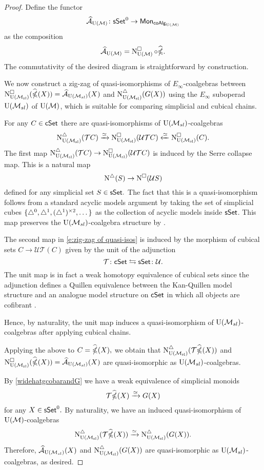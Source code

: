 \begin{proof}
	Define the functor
	$$\Ahat_{\UM} \colon \sSet^0 \to \Mon_{\coAlg_{\UM}}$$
	as the composition
	$$\Ahat_{\UM} = \cchainsUM \circ \widehat{\ccobar}.$$
	The commutativity of the desired diagram is straightforward by construction.
	
	We now construct a zig-zag of quasi-isomorphisms of $E_{\infty}$-coalgebras between $\cchainsUSL(\widehat{\ccobar}(X)) = \Ahat_{\USL}(X)$ and $\schainsUSL (G(X))$ using the $E_{\infty}$ suboperad $\USL$ of $\UM$, which is suitable for comparing simplicial and cubical chains.
	
	
	For any $C \in \cSet$ there are quasi-isomorphisms of $\USL$-coalgebras
	\begin{equation} \label{e:zig-zag of quasi-isos}
	\schainsUSL(\mathcal{T}C) \xra{\simeq}
	\cchainsUSL(\mathcal{U}\mathcal{T}C) \xleftarrow{\simeq}
	\cchainsUSL(C).
	\end{equation}	
	The first map $\schainsUSL(\mathcal{T}C) \to \cchainsUSL(\mathcal{U}\mathcal{T}C)$ is induced by the Serre collapse map.
	This is a natural map
	$$\schains(S) \to \cchains(\mathcal{U}S)$$
	defined for any simplicial set $S \in \sSet.$
	The fact that this is a quasi-isomorphism follows from a standard acyclic models argument by taking the set of simplicial cubes $\{ \simplex^0, \simplex^1, (\simplex^1)^{\times 2}, \dots\}$ as the collection of acyclic models inside $\sSet$. This map preserves the $\USL$-coalgebra structure by \cite{medina2021cubical}.
	
	The second map in \eqref{e:zig-zag of quasi-isos} is induced by the morphism of cubical sets $C \to \mathcal{U} \mathcal{T} (C)$ given by the unit of the adjunction
	$$\mathcal{T} \colon \cSet \leftrightarrows \sSet \colon \mathcal{U}.$$
	The unit map is in fact a weak homotopy equivalence of cubical sets since the adjunction defines a Quillen equivalence between the Kan-Quillen model structure and an analogue model structure on $\cSet$ in which all objects are cofibrant \cite{cisinski2006presheaves}.
	
	Hence, by naturality, the unit map induces a quasi-isomorphism of $\USL$-coalgebras after applying cubical chains.
	
	Applying the above to $C= \widehat{\ccobar}(X),$ we obtain that $\schainsUSL (\mathcal{T} \widehat{\ccobar}(X))$ and $\cchainsUSL(\widehat{\ccobar}(X)) = \Ahat_{\USL}(X)$ are quasi-isomorphic as $\USL$-coalgebras.
	
	By \cref{widehatgcobarandG} we have a weak equivalence of simplicial monoids
	$$\mathcal{T}\widehat{\ccobar}(X) \xrightarrow{\simeq} G(X)$$ for any $X \in \sSet^0.$ By naturality, we have an induced quasi-isomorphism of $\UM$-coalgebras
	$$\schainsUSL(\mathcal{T}\widehat{\ccobar}(X)) \xra{\simeq} \schainsUSL(G(X)).$$
	Therefore, $\Ahat_{\USL}(X)$ and $\schainsUSL(G(X))$ are quasi-isomorphic as $\USL$-coalgebras, as desired.
\end{proof}